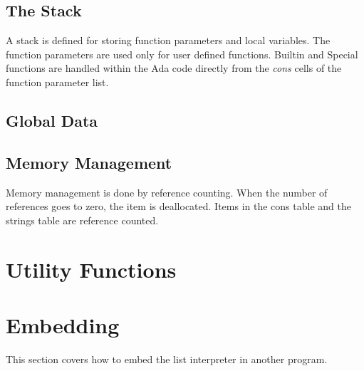 \documentclass[10pt, openany]{book}
\begin{document}
\subsection{The Stack}
A stack is defined for storing function parameters and local variables.  The function parameters are used only for user defined functions.  Builtin and Special functions are handled within the Ada code directly from the \emph{cons} cells of the function parameter list.

\subsection{Global Data}

\subsection{Memory Management}
Memory management is done by reference counting.  When the number of references goes to zero, the item is deallocated.  Items in the cons table and the strings table are reference counted.

\section{Utility Functions}

\section{Embedding}
This section covers how to embed the list interpreter in another program.
\end{document}
